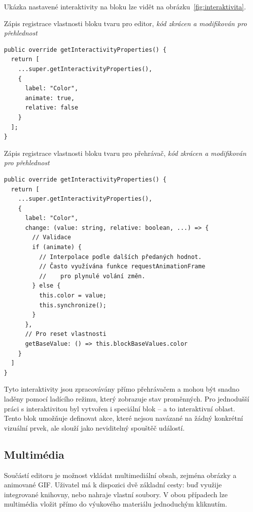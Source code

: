 Ukázka nastavené interaktivity na bloku lze vidět na obrázku~\ref{fig:interaktivita}.

\begin{listing}[ht!]
\caption[Zápis registrace vlastnosti bloku tvaru pro editor]{Zápis registrace vlastnosti bloku tvaru pro editor, \textit{kód zkrácen a modifikován pro přehlednost}}\label{code:zapisVlastnostiEditor}
\begin{verbatim}
public override getInteractivityProperties() {
  return [
    ...super.getInteractivityProperties(),
    {
      label: "Color",
      animate: true,
      relative: false
    }
  ];
}
\end{verbatim}
\end{listing}



\begin{listing}[ht!]
\caption[Zápis registrace vlastnosti bloku tvaru pro přehrávač]{Zápis registrace vlastnosti bloku tvaru pro přehrávač, \textit{kód zkrácen a modifikován pro přehlednost}}\label{code:zapisVlastnostiPrehravac}
\begin{verbatim}
public override getInteractivityProperties() {
  return [
    ...super.getInteractivityProperties(),
    {
      label: "Color",
      change: (value: string, relative: boolean, ...) => {
        // Validace
        if (animate) {
          // Interpolace podle dalších předaných hodnot.
          // Často využívána funkce requestAnimationFrame
          //    pro plynulé volání změn.
        } else {
          this.color = value;
          this.synchronize();
        }
      },
      // Pro reset vlastnosti
      getBaseValue: () => this.blockBaseValues.color
    }
  ]
}
\end{verbatim}
\end{listing}

Tyto interaktivity jsou zpracovávány přímo přehrávačem a mohou být snadno laděny pomocí ladícího režimu, který zobrazuje stav proměnných. 
Pro jednodušší práci s interaktivitou byl vytvořen i speciální blok -- a to interaktivní oblast.
Tento blok umožňuje definovat akce, které nejsou navázané na žádný konkrétní vizuální prvek, ale slouží jako neviditelný spouštěč událostí.

\subsection{Multimédia}

Součástí editoru je možnost vkládat multimediální obsah, zejména obrázky a animované GIF.
Uživatel má k dispozici dvě základní cesty: buď využije integrované knihovny, nebo nahraje vlastní soubory. 
V obou případech lze multimédia vložit přímo do výukového materiálu jednoduchým kliknutím.

